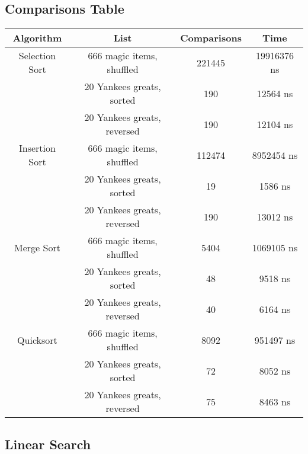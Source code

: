 \documentclass[letterpaper, 10pt,DIV=13]{scrartcl}
\numberwithin{equation}{section} %
\numberwithin{figure}{section} %
\numberwithin{table}{section} %
\begin{document}
\subsection{Comparisons Table}\label{comparisonsTable}
\begin{center}
  \begin{tabular}{|c|c|c|c|}
    \hline
    Algorithm & List & Comparisons & Time \\
    \hline
    Selection Sort & 666 magic items, shuffled & 221445 & 19916376 ns \\
    \hline
    & 20 Yankees greats, sorted & 190 & 12564 ns \\
    \hline
    & 20 Yankees greats, reversed & 190 & 12104 ns \\
    \hline
    Insertion Sort & 666 magic items, shuffled & 112474 & 8952454 ns \\
    \hline
    & 20 Yankees greats, sorted & 19 & 1586 ns \\
    \hline
    & 20 Yankees greats, reversed & 190 & 13012 ns \\
    \hline
    Merge Sort & 666 magic items, shuffled & 5404 & 1069105 ns \\
    \hline
    & 20 Yankees greats, sorted & 48 & 9518 ns \\
    \hline
    & 20 Yankees greats, reversed & 40 & 6164 ns \\
    \hline
    Quicksort & 666 magic items, shuffled & 8092 & 951497 ns \\
    \hline
    & 20 Yankees greats, sorted & 72 & 8052 ns \\
    \hline
    & 20 Yankees greats, reversed & 75 & 8463 ns \\
    \hline
  \end{tabular}
\end{center}

\lstset{numbers=left, numberstyle=\tiny, stepnumber=1, numbersep=5pt}


\subsection{Linear Search}

\end{document}
